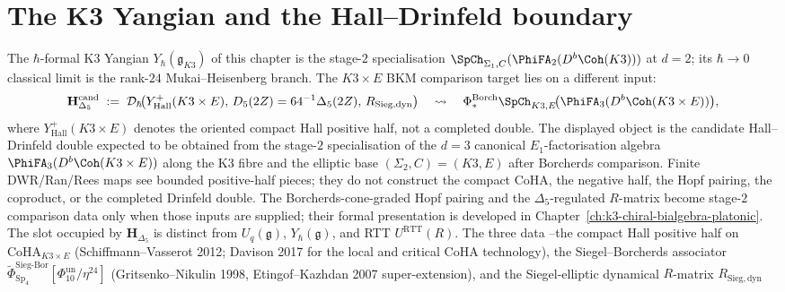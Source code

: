 \section{The K3 Yangian and the Hall--Drinfeld boundary}
\label{sec:k3yang-to-hall-drinfeld-pointer}

\begin{remark}[\texorpdfstring{$Y_\hbar(\mathfrak g_{K3})$}{Y-hbar(g-K3)} is the \texorpdfstring{$d = 2$}{d = 2} stage-\texorpdfstring{$2$}{2}
shadow; \texorpdfstring{$\mathbf H_{\Delta_5}$}{H-Delta-5} is the conditional \texorpdfstring{$d = 3$}{d = 3} Hall--Borcherds target]
\label{rem:k3yang-fourth-slot}
The $\hbar$-formal K3 Yangian $Y_\hbar(\mathfrak g_{K3})$ of this chapter
is the stage-$2$ specialisation
$\SpCh_{\Sigma_1, C}(\PhiFA_2(D^b\Coh(K3)))$ at $d = 2$; its $\hbar \to 0$
classical limit is the rank-$24$ Mukai--Heisenberg branch. The
$K3\times E$ BKM comparison target lies on a different input:
\[
\mathbf H_{\Delta_5}^{\mathrm{cand}} \;:=\; \mathcal D_\hbar\!\bigl(
 Y^+_{\mathrm{Hall}}(K3\times E),\,
 D_5(2Z)=64^{-1}\Delta_5(2Z),\,
 R_{\mathrm{Sieg,dyn}}\bigr)
\quad\leadsto\quad
\Phi^{\mathrm{Borch}}_*
\SpCh_{K3, E}\!\bigl(\PhiFA_3(D^b\Coh(K3 \times E))\bigr),
\]
where $Y^+_{\mathrm{Hall}}(K3\times E)$ denotes the oriented compact
Hall positive half, not a completed double. The displayed object is the
candidate Hall--Drinfeld double expected to be obtained from the
stage-$2$ specialisation of the $d = 3$ canonical
$E_1$-factorisation algebra $\PhiFA_3(D^b\Coh(K3 \times E))$ along the
K3 fibre and the elliptic base $(\Sigma_2, C) = (K3, E)$ after
Borcherds comparison. Finite DWR/Ran/Rees maps see bounded
positive-half pieces; they do not construct the compact CoHA, the
negative half, the Hopf pairing, the coproduct, or the completed
Drinfeld double. The Borcherds-cone-graded Hopf pairing and the
$\Delta_5$-regulated $R$-matrix become stage-$2$ comparison data only
when those inputs are supplied; their formal presentation is developed
in Chapter~\ref{ch:k3-chiral-bialgebra-platonic}. The slot occupied by
$\mathbf H_{\Delta_5}$ is distinct from $U_q(\mathfrak g)$,
$Y_\hbar(\mathfrak g)$, and RTT $U^{\mathrm{RTT}}(R)$. The three data
--the compact Hall positive half on $\mathrm{CoHA}_{K3\times E}$
(Schiffmann--Vasserot 2012; Davison 2017 for the local and critical
CoHA technology),
the Siegel--Borcherds associator
$\widetilde\Phi^{\mathrm{Sieg\text{-}Bor}}_{\mathrm{Sp}_4}
[\Phi_{10}^{\mathrm{un}}/\eta^{24}]$
(Gritsenko--Nikulin 1998, Etingof--Kazhdan 2007 super-extension), and
the Siegel-elliptic dynamical $R$-matrix $R_{\mathrm{Sieg,dyn}}$

\end{remark}
